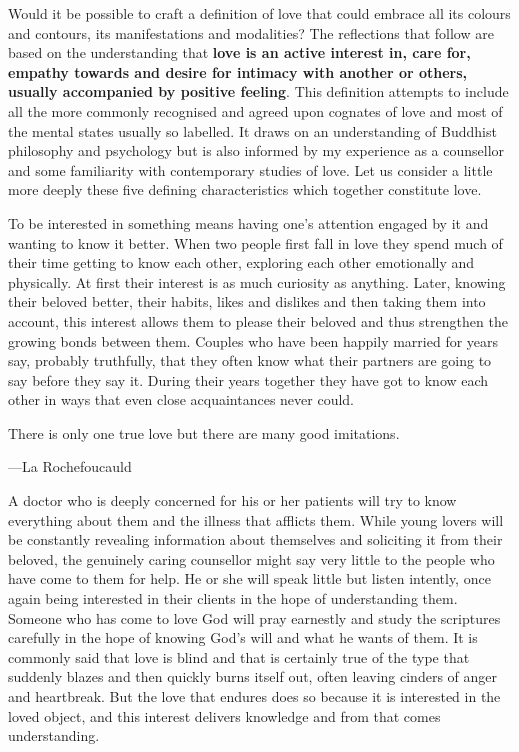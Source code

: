 \documentclass[10pt, openright]{book}
\newenvironment{epigram-2}%
{%
\setstretch{1.4}
\vspace{1em}
\noindent
\quoting[leftmargin=2cm,rightmargin=2cm]%
\begin{itshape}
\large
}%
{\end{itshape}\endquoting
}%
\newenvironment{epigram-2-cite}%
{%
\quoting[leftmargin=2cm,rightmargin=2cm]%
\noindent\normal\hspace*{\fill} 
}%
{\endquoting
}%
\begin{document}
Would it be possible to craft a definition of love that could embrace all its colours and contours, its manifestations and modalities? The reflections that follow are based on the understanding that \textbf{love is an active interest in, care for, empathy towards and desire for intimacy with another or others, usually accompanied by positive feeling}. This definition attempts to include all the more commonly recognised and agreed upon cognates of love and most of the mental states usually so labelled. It draws on an understanding of Buddhist philosophy and psychology but is also informed by my experience as a counsellor and some familiarity with contemporary studies of love. Let us consider a little more deeply these five defining characteristics which together constitute love.


To be interested in something means having one’s attention engaged by it and wanting to know it better. When two people first fall in love they spend much of their time getting to know each other, exploring each other emotionally and physically. At first their interest is as much curiosity as anything. Later, knowing their beloved better, their habits, likes and dislikes and then taking them into account, this interest allows them to please their beloved and thus strengthen the growing bonds between them. Couples who have been happily married for years say, probably truthfully, that they often know what their partners are going to say before they say it. During their years together they have got to know each other in ways that even close acquaintances never could.


\begin{epigram-2}
There is only one true love but there are many good imitations.
\end{epigram-2}
\begin{epigram-2-cite}
—La Rochefoucauld
\end{epigram-2-cite}

A doctor who is deeply concerned for his or her patients will try to know everything about them and the illness that afflicts them. While young lovers will be constantly revealing information about themselves and soliciting it from their beloved, the genuinely caring counsellor might say very little to the people who have come to them for help. He or she will speak little but listen intently, once again being interested in their clients in the hope of understanding them. Someone who has come to love God will pray earnestly and study the scriptures carefully in the hope of knowing God’s will and what he wants of them. It is commonly said that love is blind and that is certainly true of the type that suddenly blazes and then quickly burns itself out, often leaving cinders of anger and heartbreak. But the love that endures does so because it is interested in the loved object, and this interest delivers knowledge and from that comes understanding.
\end{document}

